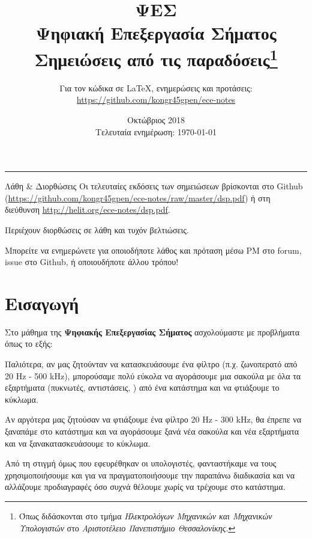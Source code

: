 \documentclass[11pt,a4paper,notitlepage,fleqn]{article}
\title{ΨΕΣ
	\\
	{ 
		\normalsize Ψηφιακή Επεξεργασία Σήματος
		\\
		\normalsize Σημειώσεις από τις παραδόσεις\footnote{Όπως διδάσκονται στο τμήμα \textit{Ηλεκτρολόγων Μηχανικών και Μηχανικών Υπολογιστών} στο \textit{Αριστοτέλειο Πανεπιστήμιο Θεσσαλονίκης}.}
	}}
\date{Οκτώβριος 2018
	\\
	{ 
		\small Τελευταία ενημέρωση: \today
	}
}
\author{
	Για τον κώδικα σε \LaTeX, ενημερώσεις και προτάσεις:
	\\
	\url{https://github.com/kongr45gpen/ece-notes}}
\begin{document}
\maketitle

\hrule
\vspace{50pt}

\begin{infobox}{Λάθη \& Διορθώσεις}
	Οι τελευταίες εκδόσεις των σημειώσεων βρίσκονται στο Github
	(\url{https://github.com/kongr45gpen/ece-notes/raw/master/dsp.pdf}) ή
	στη διεύθυνση \url{http://helit.org/ece-notes/dsp.pdf}.
	
	Περιέχουν διορθώσεις σε λάθη και τυχόν βελτιώσεις.
	
	\tcblower
	
	Μπορείτε να ενημερώνετε για οποιοδήποτε λάθος και πρόταση
	μέσω PM στο forum, issue στο Github, ή οποιουδήποτε άλλου τρόπου!
\end{infobox}

\section{Εισαγωγή}
	
Στο μάθημα της \textbf{Ψηφιακής Επεξεργασίας Σήματος} ασχολούμαστε
με προβλήματα όπως το εξής:

Παλιότερα, αν μας ζητούνταν να κατασκευάσουμε ένα φίλτρο (π.χ.
ζωνοπερατό από 20 Hz - 500 kHz), μπορούσαμε πολύ εύκολα να αγοράσουμε μια σακούλα με
όλα τα εξαρτήματα (πυκνωτές, αντιστάσεις, \textellipsis) από ένα
κατάστημα και να φτιάξουμε το κύκλωμα.

Αν αργότερα μας ζητούσαν να φτιάξουμε ένα φίλτρο 20 Hz - 300 kHz, θα
έπρεπε να ξαναπάμε στο κατάστημα και να αγοράσουμε ξανά νέα σακούλα και νέα εξαρτήματα
και να ξανακατασκευάσουμε το κύκλωμα.

Από τη στιγμή όμως που εφευρέθηκαν οι υπολογιστές, φανταστήκαμε να τους
χρησιμοποιήσουμε και για να πραγματοποιήσουμε την παραπάνω διαδικασία και
να αλλάζουμε προδιαγραφές όσο συχνά θέλουμε χωρίς να τρέχουμε στο κατάστημα.
\end{document}
